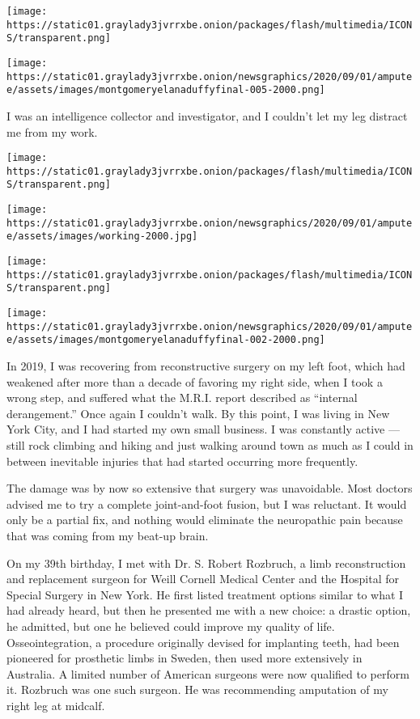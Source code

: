 \texttt{[image: https://static01.graylady3jvrrxbe.onion/packages/flash/multimedia/ICONS/transparent.png]}

\texttt{[image: https://static01.graylady3jvrrxbe.onion/newsgraphics/2020/09/01/amputee/assets/images/montgomeryelanaduffyfinal-005-2000.png]}

I was an intelligence collector and investigator, and I couldn't let my
leg distract me from my work.

\texttt{[image: https://static01.graylady3jvrrxbe.onion/packages/flash/multimedia/ICONS/transparent.png]}

\texttt{[image: https://static01.graylady3jvrrxbe.onion/newsgraphics/2020/09/01/amputee/assets/images/working-2000.jpg]}

\texttt{[image: https://static01.graylady3jvrrxbe.onion/packages/flash/multimedia/ICONS/transparent.png]}

\texttt{[image: https://static01.graylady3jvrrxbe.onion/newsgraphics/2020/09/01/amputee/assets/images/montgomeryelanaduffyfinal-002-2000.png]}

In 2019, I was recovering from reconstructive surgery on my left foot,
which had weakened after more than a decade of favoring my right side,
when I took a wrong step, and suffered what the M.R.I. report described
as ``internal derangement.'' Once again I couldn't walk. By this point,
I was living in New York City, and I had started my own small business.
I was constantly active --- still rock climbing and hiking and just
walking around town as much as I could in between inevitable injuries
that had started occurring more frequently.

The damage was by now so extensive that surgery was unavoidable. Most
doctors advised me to try a complete joint-and-foot fusion, but I was
reluctant. It would only be a partial fix, and nothing would eliminate
the neuropathic pain because that was coming from my beat-up brain.

On my 39th birthday, I met with Dr. S. Robert Rozbruch, a limb
reconstruction and replacement surgeon for Weill Cornell Medical Center
and the Hospital for Special Surgery in New York. He first listed
treatment options similar to what I had already heard, but then he
presented me with a new choice: a drastic option, he admitted, but one
he believed could improve my quality of life. Osseointegration, a
procedure originally devised for implanting teeth, had been pioneered
for prosthetic limbs in Sweden, then used more extensively in Australia.
A limited number of American surgeons were now qualified to perform it.
Rozbruch was one such surgeon. He was recommending amputation of my
right leg at midcalf.

